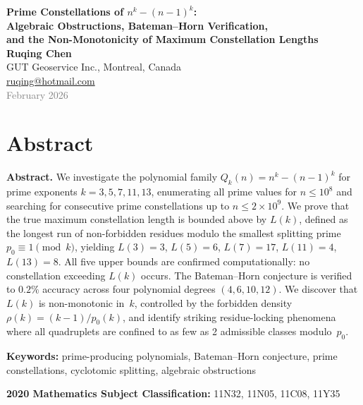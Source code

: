 \documentclass[11pt,a4paper]{article}
\newcommand{\Qk}{Q_k}
\begin{document}
\begin{center}
\vspace*{1cm}
{\LARGE\bfseries Prime Constellations of $n^k - (n-1)^k$:}\\[6pt]
{\Large\bfseries Algebraic Obstructions, Bateman--Horn Verification,}\\[4pt]
{\Large\bfseries and the Non-Monotonicity of Maximum Constellation Lengths}\\[20pt]
{\large\bfseries Ruqing Chen}\\[6pt]
GUT Geoservice Inc., Montreal, Canada\\[3pt]
\href{mailto:ruqing@hotmail.com}{\textcolor{blue!70!black}{ruqing@hotmail.com}}\\[10pt]
{\textcolor{gray}{February 2026}}
\end{center}

\vspace{20pt}

\section*{Abstract}

\noindent\textbf{Abstract.}
We investigate the polynomial family $\Qk(n) = n^k - (n-1)^k$ for prime exponents $k = 3, 5, 7, 11, 13$, enumerating all prime values for $n \le 10^8$ and searching for consecutive prime constellations up to $n \le 2\times 10^9$. We prove that the true maximum constellation length is bounded above by $L(k)$, defined as the longest run of non-forbidden residues modulo the smallest splitting prime $p_0 \equiv 1 \pmod{k}$, yielding $L(3) = 3$, $L(5) = 6$, $L(7) = 17$, $L(11) = 4$, $L(13) = 8$. All five upper bounds are confirmed computationally: no constellation exceeding $L(k)$ occurs. The Bateman--Horn conjecture is verified to $0.2\%$ accuracy across four polynomial degrees $(4, 6, 10, 12)$. We discover that $L(k)$ is non-monotonic in~$k$, controlled by the forbidden density $\rho(k) = (k-1)/p_0(k)$, and identify striking residue-locking phenomena where all quadruplets are confined to as few as 2 admissible classes modulo~$p_0$.

\medskip
\noindent\textbf{Keywords:} prime-producing polynomials, Bateman--Horn conjecture, prime constellations, cyclotomic splitting, algebraic obstructions

\medskip
\noindent\textbf{2020 Mathematics Subject Classification:} 11N32, 11N05, 11C08, 11Y35
\end{document}
